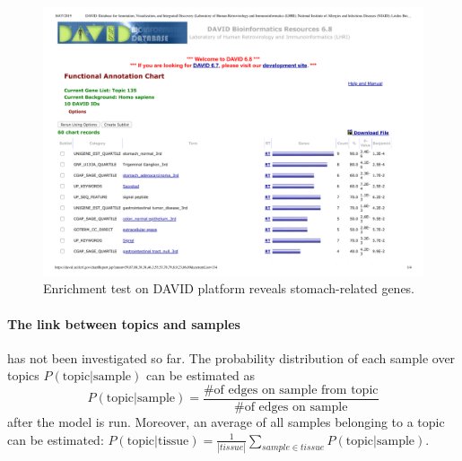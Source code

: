 \begin{figure}[htb!]
    \centering
    \includegraphics[width=0.8\linewidth]{pictures/topic/merged/DAVID_stomach.pdf}
    \caption{Enrichment test on DAVID platform reveals stomach-related genes.}
    \label{fig:topic/merged/DAVID_stomach}
\end{figure}

\clearpage
\paragraph{The link between topics and samples} has not been investigated so far. The probability distribution of each sample over topics $P(\text{topic}| \text{sample})$ can be estimated as \[P(\text{topic}| \text{sample})=\frac{\text{\# of edges on sample from topic}}{\text{\# of edges on sample}}\] after the model is run. Moreover, an average of all samples belonging to a topic can be estimated: $P(\text{topic}| \text{tissue})=\frac{1}{\left|tissue\right|}\sum_{sample\in tissue}P(\text{topic}| \text{sample})$.

